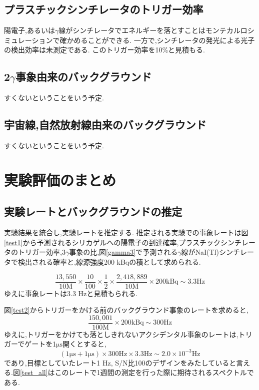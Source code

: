 \subsection{プラスチックシンチレータのトリガー効率}
陽電子,あるいは$\gamma$線がシンチレータでエネルギーを落とすことはモンテカルロシミュレーションで確かめることができる.
一方で,シンチレータの発光による光子の検出効率は未測定である.
このトリガー効率を10\%と見積もる.

\subsection{2$\gamma$事象由来のバックグラウンド}
すくないということをいう予定.

\subsection{宇宙線,自然放射線由来のバックグラウンド}
すくないということをいう予定.\cite{小早川201207}

\section{実験評価のまとめ}
\label{section_testall}

\subsection{実験レートとバックグラウンドの推定}
実験結果を統合し,実験レートを推定する.
推定される実験での事象レートは図\ref{test1}から予測されるシリカゲルへの陽電子の到達確率,プラスチックシンチレータのトリガー効率,$3\gamma$事象の比,図\ref{gamma3}で予測される$\gamma$線がNaI(Tl)シンチレータで検出される確率と,線源強度200 kBqの積として求められる.

\begin{equation}
	\nonumber
	\frac{13,550}{10 \mathrm{M}} \times \frac{10}{100} \times \frac{1}{2} \times \frac{2,418,889}{10 \mathrm{M}} \times 200 \mathrm{kBq} \sim 3.3 \mathrm{Hz}
\end{equation}
ゆえに事象レートは3.3 Hzと見積もられる.

図\ref{test2}からトリガーをかける前のバックグラウンド事象のレートを求めると,
\begin{equation}
	\nonumber
	\frac{150,001}{100\mathrm{M}} \times 200 \mathrm{kBq} \sim 300 \mathrm{ Hz}
\end{equation}
ゆえに,トリガーをかけても落としきれないアクシデンタル事象のレートは,トリガーでゲートを1$\si{\micro \second}$開くとすると,
\begin{equation}
	\nonumber
	( 1 \si{\micro \second} + 1 \si{\micro \second}) \times  300 \mathrm{Hz} \times 3.3 \mathrm{Hz} \sim 2.0 \times 10^{-3} \mathrm{Hz}
\end{equation}
であり,目標としていたレート1 Hz, S/N比100のデザインをみたしていると言える.図\ref{test_all}はこのレートで1週間の測定を行った際に期待されるスペクトルである.

